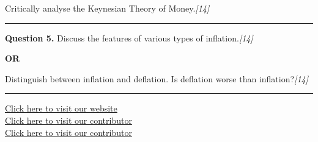 \documentclass[11pt,a4paper]{article}
\newcommand{\pts}[1]{\hfill   \textit{[#1]}}
\begin{document}
Critically analyse the Keynesian Theory of Money.\pts{14}

\medskip\rule{\linewidth}{0.2pt}




\noindent   \textbf{Question 5.}
Discuss the features of various types of inflation.\pts{14}

\centerline{   \textbf{OR}}

Distinguish between inflation and deflation. Is deflation worse than inflation?\pts{14}

\vfill
\rule{\linewidth}{0.4pt}

\begin{center}\small
\href{https://bhu-exam.vercel.app/}{Click here to visit our website}\\[4pt]
\href{https://me-aryan.vercel.app/}{Click here to visit our contributor}\\[4pt]
\href{https://quashan-me.vercel.app/}{Click here to visit our contributor}
\end{center}
\end{document}
